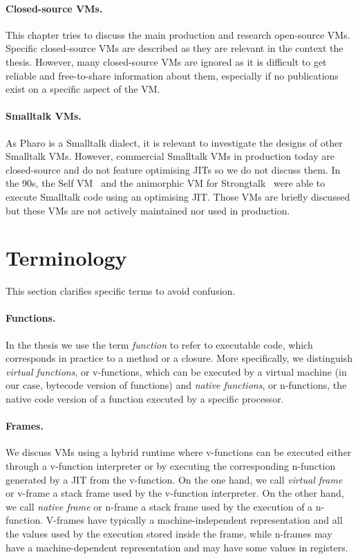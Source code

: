 \documentclass[a4paper,12pt,twoside]{../includes/ThesisStyle}
\begin{document}
\paragraph{Closed-source VMs.} This chapter tries to discuss the main production and research open-source VMs. Specific closed-source VMs are described as they are relevant in the context the thesis. However, many closed-source VMs are ignored as it is difficult to get reliable and free-to-share information about them, especially if no publications exist on a specific aspect of the VM. 

\paragraph{Smalltalk VMs.} As Pharo is a Smalltalk dialect, it is relevant to investigate the designs of other Smalltalk VMs. However, commercial Smalltalk VMs in production today are closed-source and do not feature optimising JITs so we do not discuss them. In the 90s, the Self VM~\cite{UrsPHD} and the animorphic VM for Strongtalk~\cite{Sun06} were able to execute Smalltalk code using an optimising JIT. Those VMs are briefly discussed but these VMs are not actively maintained nor used in production.


\section{Terminology}

This section clarifies specific terms to avoid confusion.

\paragraph{Functions.} In the thesis we use the term \emph{function} to refer to executable code, which corresponds in practice to a method or a closure. More specifically, we distinguish \emph{virtual functions}, or v-functions, which can be executed by a virtual machine (in our case, bytecode version of functions) and \emph{native functions}, or n-functions, the native code version of a function executed by a specific processor. 

\paragraph{Frames.} We discuss VMs using a hybrid runtime where v-functions can be executed either through a v-function interpreter or by executing the corresponding n-function generated by a JIT from the v-function. On the one hand, we call \emph{virtual frame} or v-frame a stack frame used by the v-function interpreter. On the other hand, we call \emph{native frame} or n-frame a stack frame used by the execution of a n-function. V-frames have typically a machine-independent representation and all the values used by the execution stored inside the frame, while n-frames may have a machine-dependent representation and may have some values in registers.
\end{document}
